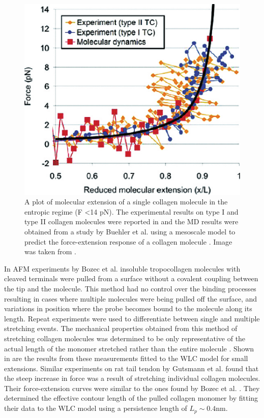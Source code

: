 \begin{figure}[H]
\centering
\includegraphics[scale=1]{Graphics/Collagen/Fratzl_2008_fig8p22.pdf}
\caption{A plot of molecular extension of a single collagen molecule in the entropic regime (F \textless 14 pN). The experimental results on type I and type II collagen molecules were reported in \cite{Sun2002,Sun2004} and the MD results were obtained from a study by Buehler et al. using a mesoscale model to predict the force-extension response of a collagen molecule \cite{Buehler2007}. Image was taken from \cite{Fratzl2008}.} 
\label{fig:tc_entropic_response}
\end{figure}

In AFM experiments by Bozec et al. insoluble tropocollagen molecules with cleaved terminals were pulled from a surface without a covalent coupling between the tip and the molecule. This method had no control over the binding processes resulting in cases where multiple molecules were being pulled off the surface, and variations in position where the probe becomes bound to the molecule along its length. Repeat experiments were used to differentiate between single and multiple stretching events. The mechanical properties obtained from this  method of stretching collagen molecules was determined to be only representative of the actual length of the monomer stretched rather than the entire molecule \cite{Bozec2005a}. Shown in  are the results from these measurements fitted to the WLC model for small extensions. Similar experiments on rat tail tendon by Gutsmann et al. found that the steep increase in force was a result of stretching individual collagen molecules. Their force-extension curves were similar to the ones found by Bozec et al. \cite{Bozec2005a,Gutsmann2004}. They determined the effective contour length of the pulled collagen monomer by fitting their data to the WLC model using a persistence length of $L_{p} \sim 0.4 \text{nm}$.  

